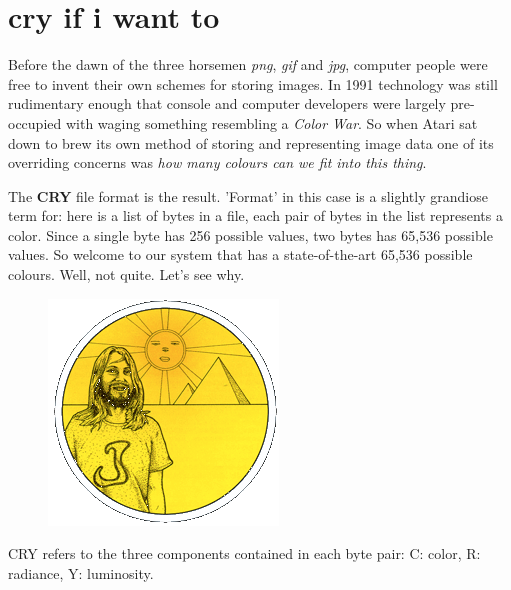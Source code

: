 \chapter{cry if i want to} 
\label{sec:listing}
\lstset{style=6502Style}
Before the dawn of the three horsemen \textit{png}, \textit{gif} and \textit{jpg}, computer people were free to invent their 
own schemes for storing images. In 1991 technology was still
rudimentary enough that console and computer developers were largely pre-occupied with waging something resembling a \textit{Color War}. So
when Atari sat down to brew its own method of storing and representing image data one of its overriding concerns was \textit{how many
colours can we fit into this thing}.

The \textbf{CRY} file format is the result. 'Format' in this case is a slightly grandiose term for: here is a list of bytes in a file,
each pair of bytes in the list represents a color. Since a single byte has 256 possible values, two bytes has 65,536 possible values.
So welcome to our system that has a state-of-the-art 65,536 possible colours. Well, not quite. Let's see why.

\begin{definition}
\setlength{\intextsep}{0pt}%
\setlength{\columnsep}{3pt}%
\begin{figure}
\includegraphics[width=\linewidth]{src/callout/psych.png} 
\end{figure}
\small
CRY refers to the three components contained in each byte pair: C: color, R: radiance, Y: luminosity.
\end{definition}

